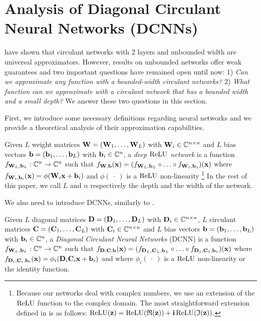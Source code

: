 \section{Analysis of Diagonal Circulant Neural Networks (DCNNs)}
\label{section:analysis_diagonal_circulant}

\citet{pmlr-v70-zhao17b} have shown that circulant networks with 2 layers and unbounded width are universal approximators. However, results on unbounded networks offer weak guarantees and two important questions have remained open until now: 1) \emph{Can we approximate any function with a bounded-width circulant networks?} 2) \emph{What function can we approximate with a circulant network that has a bounded width and a small depth?} 
We answer these two questions in this section.

First, we introduce some necessary definitions regarding neural networks and we provide a theoretical analysis of their approximation capabilities.  

\begin{definition} \label{definition:deep_relu_network}
Given $L$ weight matrices $\mathbf{W} = (\mathbf{W}_1, \ldots, \mathbf{W}_L)$ with $\mathbf{W}_i \in {\ensuremath \mathbb{C}}^{n \times n}$ and  $L$ bias vectors $\mathbf{b} = (\mathbf{b}_1, \ldots, \mathbf{b}_L)$  with  $\mathbf{b}_i \in {\ensuremath \mathbb{C}}^{n}$, a \emph{deep $\operatorname{ReLU}$ network} is a function $f_{\mathbf{W}_L, \mathbf{b}_L} : {\mathbb{C}}^{n} \rightarrow {\ensuremath \mathbb{C}}^{n}$ such that $f_{\mathbf{W}, \mathbf{b}}(\mathbf{x}) =  (f_{\mathbf{W}_L, \mathbf{b}_L} \circ \ldots \circ f_{\mathbf{W}_1, \mathbf{b}_1})(\mathbf{x})$ where $f_{\mathbf{W}_i, \mathbf{b}_i}(\mathbf{x}) = \phi(\mathbf{W}_i \mathbf{x} + \mathbf{b}_i)$ and $\phi(\ \cdot\ )$ is a $\operatorname{ReLU}$ non-linearity \footnote{Because our networks deal with complex numbers, we use an extension of the $\operatorname{ReLU}$ function to the complex domain. The most straightforward extension defined in \cite{DBLP:conf/iclr/TrabelsiBZSSSMR18} is as follows: $\mathrm{\relu}(\zvec) = \relu\left(\mathfrak{R}(\zvec)\right) + \ci \relu \left(\mathfrak{I}(\zvec)\right)$.}
In the rest of this paper, we call $L$ and $n$ respectively the depth and the width of the network.
\end{definition}

We also need to introduce DCNNs, similarly to \citet{moczulski2015acdc}.

\begin{definition} \label{definition:DCNN}
Given $L$ diagonal matrices $\mathbf{D} = (\mathbf{D}_1, \ldots, \mathbf{D}_L)$ with $\mathbf{D}_i \in {\ensuremath \mathbb{C}}^{n \times n}$, $L$ circulant matrices $\mathbf{C} = (\mathbf{C}_1, \ldots, \mathbf{C}_L)$ with $\mathbf{C}_i \in {\ensuremath \mathbb{C}}^{n \times n}$ and $L$ bias vectors $\mathbf{b} = (\mathbf{b}_1, \ldots, \mathbf{b}_L)$ with  $\mathbf{b}_i \in {\ensuremath \mathbb{C}}^{n}$, a \emph{Diagonal Circulant Neural Networks} (DCNN) is a function $f_{\mathbf{W}_L, \mathbf{b}_L} : {\mathbb{C}}^{n} \rightarrow {\ensuremath \mathbb{C}}^{n}$ such that $f_{\mathbf{D},\mathbf{C},\mathbf{b}}(\mathbf{x}) = (f_{\mathbf{D}_L, \mathbf{C}_L, \mathbf{b}_L} \circ \ldots \circ f_{\mathbf{D}_1, \mathbf{C}_1, \mathbf{b}_1})(\mathbf{x})$ where $f_{\mathbf{D}_i, \mathbf{C}_i, \mathbf{b}_i}(\mathbf{x}) = \phi_i (\mathbf{D}_i \mathbf{C}_i \mathbf{x} + \mathbf{b}_i)$ and where $\phi_i(\ \cdot\ )$ is a $\operatorname{ReLU}$ non-linearity or the identity function.
\end{definition}

